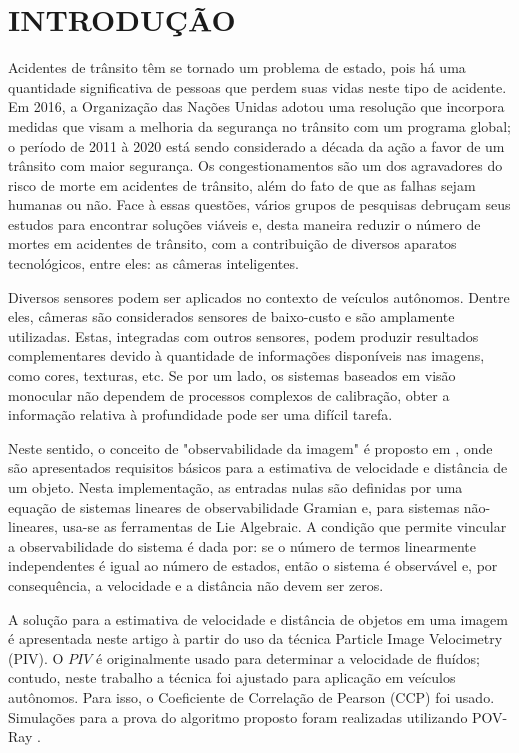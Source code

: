 \section{INTRODUÇÃO}

Acidentes de trânsito têm se tornado um problema de estado, pois há uma quantidade significativa de pessoas que
perdem suas vidas neste tipo de acidente. Em 2016, a Organização das Nações Unidas adotou uma 
resolução que incorpora medidas que visam 
a melhoria da segurança no trânsito com um programa global; 
o período de 2011 à 2020 está sendo considerado a década da ação a favor
de um trânsito com maior segurança.
Os congestionamentos são um dos agravadores do risco de morte em acidentes de trânsito, 
além do fato de que as falhas sejam humanas ou não. 
Face à essas questões, vários grupos de pesquisas debruçam seus estudos 
para encontrar soluções viáveis e, desta maneira
reduzir o número de mortes em acidentes de trânsito, com a 
contribuição de diversos aparatos tecnológicos, entre eles: as câmeras inteligentes.


Diversos sensores podem ser aplicados no contexto de veículos autônomos. Dentre eles, 
câmeras são considerados sensores de baixo-custo e são amplamente utilizadas. 
Estas, integradas com outros sensores, podem produzir resultados complementares devido à 
quantidade de informações disponíveis nas imagens, como cores, texturas, etc. 
Se por um lado, os sistemas baseados em visão monocular não dependem de processos 
complexos de calibração, obter a informação relativa à profundidade pode ser uma difícil 
tarefa.


Neste sentido, o conceito de "observabilidade da imagem" é 
proposto em \cite{Breugel}, onde são apresentados requisitos 
básicos para a estimativa de velocidade e 
distância de um objeto. Nesta implementação, as entradas nulas 
são definidas por uma equação de sistemas lineares de observabilidade Gramian e,
para sistemas não-lineares, usa-se as ferramentas de Lie Algebraic. 
A condição que permite vincular a observabilidade do sistema é dada por:
se o número de termos linearmente independentes é igual ao número de estados, 
então o sistema é observável e, por consequência, a velocidade e a 
distância não devem ser zeros.

A solução para a estimativa de velocidade e distância de objetos em uma imagem é 
apresentada neste artigo à partir do uso da técnica Particle Image Velocimetry (PIV). 
O $PIV$ é originalmente usado para determinar a velocidade de fluídos; contudo, neste trabalho
a técnica foi ajustado para aplicação em veículos autônomos. Para isso, o Coeficiente de 
Correlação de Pearson (CCP) \cite{Miranda Neto} foi usado. Simulações 
para a prova do algoritmo proposto foram realizadas utilizando POV-Ray \cite{povray}.




















